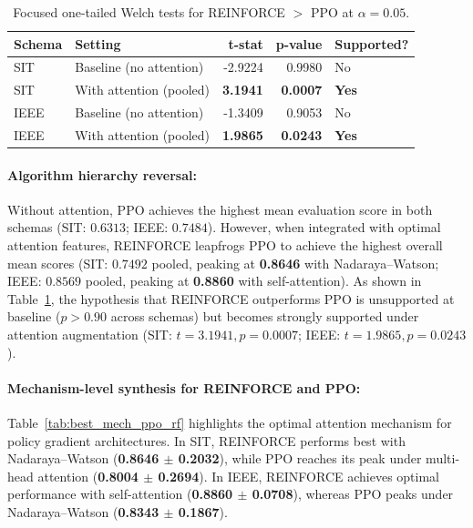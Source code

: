\documentclass[sn-basic]{sn-jnl}%
\begin{document}
\begin{table}[htbp]
	\centering
	\caption{Focused one-tailed Welch tests for \textsc{REINFORCE} $>$ \textsc{PPO} at $\alpha=0.05$.}
	\label{tab:rf_vs_ppo_tests}
	\begin{tabular}{l l r r l}
	\toprule
	\textbf{Schema} & \textbf{Setting} & \textbf{t-stat} & \textbf{p-value} & \textbf{Supported?}\\
	\midrule
	SIT & Baseline (no attention) & -2.9224 & 0.9980 & No\\
	SIT & With attention (pooled) & \textbf{3.1941} & \textbf{0.0007} & \textbf{Yes}\\
	IEEE & Baseline (no attention) & -1.3409 & 0.9053 & No\\
	IEEE & With attention (pooled) & \textbf{1.9865} & \textbf{0.0243} & \textbf{Yes}\\
	\bottomrule
	\end{tabular}
\end{table}

\paragraph{Algorithm hierarchy reversal:}
Without attention, \textsc{PPO} achieves the highest mean evaluation score in both schemas (SIT: $0.6313$; IEEE: $0.7484$). However, when integrated with optimal attention features, \textsc{REINFORCE} leapfrogs \textsc{PPO} to achieve the highest overall mean scores (SIT: $0.7492$ pooled, peaking at \textbf{0.8646} with Nadaraya--Watson; IEEE: $0.8569$ pooled, peaking at \textbf{0.8860} with self-attention). As shown in Table~\ref{tab:rf_vs_ppo_tests}, the hypothesis that \textsc{REINFORCE} outperforms \textsc{PPO} is unsupported at baseline ($p > 0.90$ across schemas) but becomes strongly supported under attention augmentation (SIT: $t = 3.1941, p = 0.0007$; IEEE: $t = 1.9865, p = 0.0243$).

\paragraph{Mechanism-level synthesis for \textsc{REINFORCE} and \textsc{PPO}:}
Table~\ref{tab:best_mech_ppo_rf} highlights the optimal attention mechanism for policy gradient architectures. In SIT, \textsc{REINFORCE} performs best with Nadaraya--Watson (\textbf{0.8646 $\pm$ 0.2032}), while \textsc{PPO} reaches its peak under multi-head attention (\textbf{0.8004 $\pm$ 0.2694}). In IEEE, \textsc{REINFORCE} achieves optimal performance with self-attention (\textbf{0.8860 $\pm$ 0.0708}), whereas \textsc{PPO} peaks under Nadaraya--Watson (\textbf{0.8343 $\pm$ 0.1867}).
\end{document}
